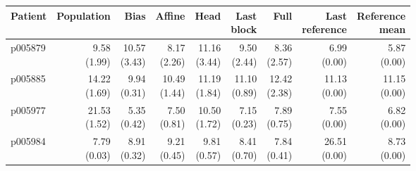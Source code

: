 \documentclass[11pt]{article}
\begin{document}
\begin{table}[!htbp]\centering\scriptsize\setlength{\tabcolsep}{3pt}
\begin{tabular}{lrrrrrrrr}\toprule
Patient & Population & Bias & Affine & Head & \shortstack{Last\\block} & Full & \shortstack{Last\\reference} & \shortstack{Reference\\mean}\\\midrule
p005879 & \shortstack{9.58\\(1.99)} & \shortstack{10.57\\(3.43)} & \shortstack{8.17\\(2.26)} & \shortstack{11.16\\(3.44)} & \shortstack{9.50\\(2.44)} & \shortstack{8.36\\(2.57)} & \shortstack{6.99\\(0.00)} & \shortstack{5.87\\(0.00)}\\
p005885 & \shortstack{14.22\\(1.69)} & \shortstack{9.94\\(0.31)} & \shortstack{10.49\\(1.44)} & \shortstack{11.19\\(1.84)} & \shortstack{11.10\\(0.89)} & \shortstack{12.42\\(2.38)} & \shortstack{11.13\\(0.00)} & \shortstack{11.15\\(0.00)}\\
p005977 & \shortstack{21.53\\(1.52)} & \shortstack{5.35\\(0.42)} & \shortstack{7.50\\(0.81)} & \shortstack{10.50\\(1.72)} & \shortstack{7.15\\(0.23)} & \shortstack{7.89\\(0.75)} & \shortstack{7.55\\(0.00)} & \shortstack{6.82\\(0.00)}\\
p005984 & \shortstack{7.79\\(0.03)} & \shortstack{8.91\\(0.32)} & \shortstack{9.21\\(0.45)} & \shortstack{9.81\\(0.57)} & \shortstack{8.41\\(0.70)} & \shortstack{7.84\\(0.41)} & \shortstack{26.51\\(0.00)} & \shortstack{8.73\\(0.00)}\\

\end{tabular}
\end{table}
\end{document}
